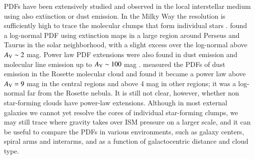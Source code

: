 \documentclass{aa}
\begin{document}
PDFs have been extensively studied  and observed in the local interstellar medium using
also extinction or dust emission. In the  Milky Way the resolution  is sufficiently
high to trace the molecular clumps that form individual stars
\citep{kainulainen09,kainulainen11,froebrich10,lombardi10,schneider12,schneider15b}.
\cite{lombardi10} found a log-normal PDF using
extinction maps in a large region around Perseus and Taurus in the solar neighborhood, with a
slight excess over the log-normal above $A_{\rm V}\sim2$ mag. Power law PDF extensions
were also found in dust emission \citep{schneider13,schneider15a,schneider15c,lombardi15} 
and molecular line emission \citep{schneider16} up to $A_{\rm V}\sim100$ mag \citep{schneider15b}.
\cite{schneider12} measured the PDFs of dust emission in the Rosette molecular cloud
and found it became a power law above $A_{\rm V}=9$ mag in the central regions and
above 4 mag in other regions; it was a log-normal far from the Rosette nebula.  
It is still not clear, however,  whether non star-forming clouds have  power-law extensions. 
Although in most external galaxies we cannot yet resolve the cores of individual
star-forming clumps, we may still trace where gravity takes over ISM pressure on
a larger scale, and it can be useful to  compare the PDFs in various environments, such as
galaxy centers, spiral arms and interarms, and as a function of galactocentric
distance and cloud type.  
\end{document}
